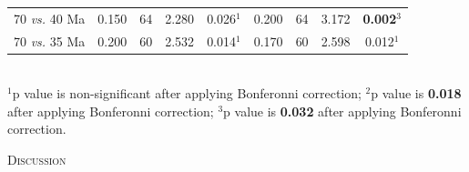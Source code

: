 \documentclass[12pt,letterpaper]{article}
\renewcommand{\section}[1]{%
\bigskip
\begin{center}
\begin{Large}
\normalfont\scshape #1
\medskip
\end{Large}
\end{center}}
\begin{document}
\begin{table}[ht]
\begin{tabular}{r|cccc|cccc}
  70 \textit{vs.} 40 Ma &  0.150 & 64 & 2.280 & 0.026$^1$ & 0.200 & 64 & 3.172 & \textbf{0.002}$^3$ \\ 
  70 \textit{vs.} 35 Ma &  0.200 & 60 & 2.532 & 0.014$^1$ & 0.170 & 60 & 2.598 & 0.012$^1$ \\ 
   \hline
\end{tabular} \\
   \small{$^1$p value is non-significant after applying Bonferonni correction;
   $^2$p value is \textbf{0.018} after applying Bonferonni correction;
   $^3$p value is \textbf{0.032} after applying Bonferonni correction.}
\end{table}



%
%

\section{Discussion}
\end{document}
